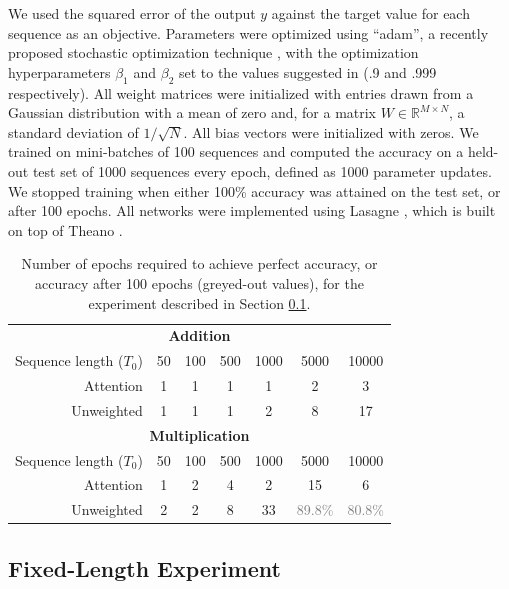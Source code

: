 \documentclass{article} %
\begin{document}
We used the squared error of the output $y$ against the target value for each sequence as an objective.
Parameters were optimized using ``adam'', a recently proposed stochastic optimization technique \cite{kingma2014adam}, with the optimization hyperparameters $\beta_1$ and $\beta_2$ set to the values suggested in \cite{kingma2014adam} (.9 and .999 respectively).
All weight matrices were initialized with entries drawn from a Gaussian distribution with a mean of zero and, for a matrix $W \in \mathbb{R}^{M \times N}$, a standard deviation of $1/\sqrt{N}$.
All bias vectors were initialized with zeros.
We trained on mini-batches of 100 sequences and computed the accuracy on a held-out test set of 1000 sequences every epoch, defined as 1000 parameter updates.
We stopped training when either 100\% accuracy was attained on the test set, or after 100 epochs.
All networks were implemented using Lasagne \cite{dieleman2015lasagne}, which is built on top of Theano \cite{bastien2012theano,bergstra2010theano}.

\begin{table}
  \centering
  \begin{tabular}{r c c c c c c}
    \toprule
    \multicolumn{7}{c}{\textbf{Addition}} \\
    Sequence length ($T_0$) & 50 & 100 & 500 & 1000 & 5000 & 10000 \\
    \cmidrule(r){2-7}
    Attention & 1 & 1 & 1 & 1 & 2 & 3 \\
    Unweighted & 1 & 1 & 1 & 2 & 8 & 17 \\
    \midrule
    \multicolumn{7}{c}{\textbf{Multiplication}} \\
    Sequence length ($T_0$) & 50 & 100 & 500 & 1000 & 5000 & 10000 \\
    \cmidrule(r){2-7}
    Attention & 1 & 2 & 4 & 2 & 15 & 6 \\
    Unweighted & 2 & 2 & 8 & 33 & \textcolor{gray}{89.8\%} & \textcolor{gray}{80.8\%} \\
    \bottomrule
  \end{tabular}
  \caption{Number of epochs required to achieve perfect accuracy, or accuracy after 100 epochs (greyed-out values), for the experiment described in Section \ref{sec:fixed}.}
  \label{tab:fixed}
\end{table}

\subsection{Fixed-Length Experiment}
\label{sec:fixed}
\end{document}
